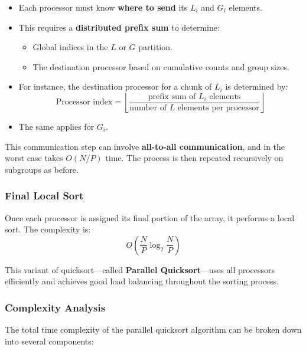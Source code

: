 \documentclass[12pt]{book}
\begin{document}
\begin{itemize}
    \item Each processor must know \textbf{where to send} its $L_i$ and $G_i$ elements.
    \item This requires a \textbf{distributed prefix sum} to determine:
    \begin{itemize}
        \item Global indices in the $L$ or $G$ partition.
        \item The destination processor based on cumulative counts and group sizes.
    \end{itemize}
    
    \item For instance, the destination processor for a chunk of $L_i$ is determined by:
    \[
    \text{Processor index} = \left\lfloor \frac{\text{prefix sum of $L_i$ elements}}{\text{number of $L$ elements per processor}} \right\rfloor
    \]
    
    \item The same applies for $G_i$.
\end{itemize}

This communication step can involve \textbf{all-to-all communication}, and in the worst case takes $O(N/P)$ time. The process is then repeated recursively on subgroups as before.

\subsubsection*{Final Local Sort}

Once each processor is assigned its final portion of the array, it performs a local sort. The complexity is:
\[
O\left(\frac{N}{P} \log_2 \frac{N}{P} \right)
\]

This variant of quicksort—called \textbf{Parallel Quicksort}—uses all processors efficiently and achieves good load balancing throughout the sorting process.

\subsubsection{Complexity Analysis}

The total time complexity of the parallel quicksort algorithm can be broken down into several components:
\end{document}
